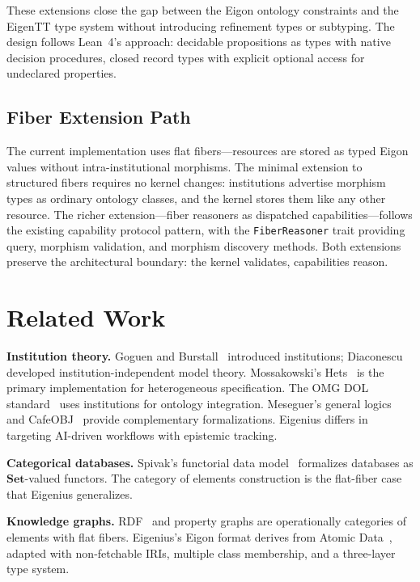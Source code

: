 \documentclass[10pt,twocolumn,letterpaper]{article}
\newcommand{\code}[1]{\texttt{\small #1}}
\newcommand{\Set}{\mathbf{Set}}
\begin{document}
These extensions close the gap between the Eigon ontology constraints and the EigenTT type system without introducing refinement types or subtyping.
The design follows Lean~4's approach: decidable propositions as types with native decision procedures, closed record types with explicit optional access for undeclared properties.

\subsection{Fiber Extension Path}

The current implementation uses flat fibers---resources are stored as typed Eigon values without intra-institutional morphisms.
The minimal extension to structured fibers requires no kernel changes: institutions advertise morphism types as ordinary ontology classes, and the kernel stores them like any other resource.
The richer extension---fiber reasoners as dispatched capabilities---follows the existing capability protocol pattern, with the \code{FiberReasoner} trait providing query, morphism validation, and morphism discovery methods.
Both extensions preserve the architectural boundary: the kernel validates, capabilities reason.


\section{Related Work}
\label{sec:related}

\textbf{Institution theory.}
Goguen and Burstall~\cite{goguen1992} introduced institutions; Diaconescu~\cite{diaconescu2008} developed institution-independent model theory.
Mossakowski's Hets~\cite{mossakowski2007hets} is the primary implementation for heterogeneous specification.
The OMG DOL standard~\cite{ontoiop} uses institutions for ontology integration.
Meseguer's general logics~\cite{meseguer1989} and CafeOBJ~\cite{cafeobj} provide complementary formalizations.
Eigenius differs in targeting AI-driven workflows with epistemic tracking.

\textbf{Categorical databases.}
Spivak's functorial data model~\cite{spivak2012} formalizes databases as $\Set$-valued functors.
The category of elements construction is the flat-fiber case that Eigenius generalizes.

\textbf{Knowledge graphs.}
RDF~\cite{rdf} and property graphs are operationally categories of elements with flat fibers.
Eigenius's Eigon format derives from Atomic Data~\cite{atomicdata}, adapted with non-fetchable IRIs, multiple class membership, and a three-layer type system.
\end{document}

